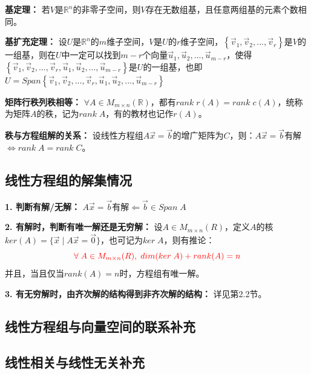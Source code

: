\documentclass[zihao=-4,UTF8]{report}
\begin{document}
\textbf{基定理：}
若$V$是$\mathbb{R}^n$的非零子空间，则$V$存在无数组基，且任意两组基的元素个数相同。

\textbf{基扩充定理：}
设$U$是$\mathbb{R}^n$的$m$维子空间，$V$是$U$的$r$维子空间，$\left\{\vec{v}_1,\vec{v}_2,...,\vec{v}_r \right\}$是$V$的一组基，则在$U$中一定可以找到$m-r$个向量$\vec{u}_1,\vec{u}_2,...,\vec{u}_{m-r}$，使得$\left\{\vec{v}_1,\vec{v}_2,...,\vec{v}_r,\vec{u}_1,\vec{u}_2,...,\vec{u}_{m-r} \right\}$是$U$的一组基，也即$U=Span\left\{\vec{v}_1,\vec{v}_2,...,\vec{v}_r,\vec{u}_1,\vec{u}_2,...,\vec{u}_{m-r} \right\}$

\textbf{矩阵行秩列秩相等：}
$\forall A\in M_{m\times n}(\mathbb{R})$，都有$rank\;r(A)=rank\;c(A)$，统称为矩阵$A$的秩，记为$rank\;A$，有的教材也记作$r(A)$。

\textbf{秩与方程组解的关系：}
设线性方程组$A\vec{x}=\vec{b}$的增广矩阵为$C$，则：$A\vec{x}=\vec{b}$有解$\Longleftrightarrow  rank\;A=rank\;C$。

\subsection{线性方程组的解集情况}

\textbf{1. 判断有解/无解：}
$A\vec{x}=\vec{b}$有解$\Longleftarrow \vec{b}\in Span\;A$\par
\textbf{2. 有解时，判断有唯一解还是无穷解：}
设$A\in M_{m\times n}(R)$，定义$A$的核$ker(A)= \{\vec{x}\mid A\vec{x}=\vec{0}\}$，也可记为$ker\;A$，则有推论：
\begin{equation*}
    \color{red}
    \forall\;A\in M_{m\times n}(R),\;dim(ker\;A)+rank(A)=n
\end{equation*}
\indent 并且，当且仅当$rank(A)=n$时，方程组有唯一解。

\textbf{3. 有无穷解时，由齐次解的结构得到非齐次解的结构：}
详见第2.2节。

\subsection{线性方程组与向量空间的联系补充}
\subsection{线性相关与线性无关补充}
\end{document}
